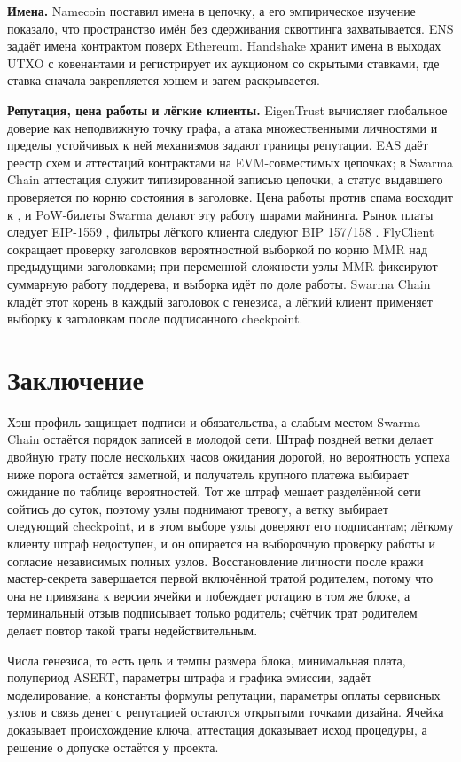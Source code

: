 \documentclass[10pt,a4paper]{article}
\begin{document}
\textbf{Имена.}
Namecoin \cite{namecoin} поставил имена в цепочку, а его эмпирическое изучение \cite{namecoinstudy} показало, что пространство имён без сдерживания сквоттинга захватывается.
ENS \cite{ens} задаёт имена контрактом поверх Ethereum.
Handshake \cite{handshake} хранит имена в выходах UTXO с ковенантами и регистрирует их аукционом со скрытыми ставками, где ставка сначала закрепляется хэшем и затем раскрывается.

\textbf{Репутация, цена работы и лёгкие клиенты.}
EigenTrust \cite{eigentrust} вычисляет глобальное доверие как неподвижную точку графа, а атака множественными личностями \cite{sybil} и пределы устойчивых к ней механизмов \cite{sybilproof} задают границы репутации.
EAS \cite{eas} даёт реестр схем и аттестаций контрактами на EVM-совместимых цепочках; в Swarma Chain аттестация служит типизированной записью цепочки, а статус выдавшего проверяется по корню состояния в заголовке.
Цена работы против спама восходит к \cite{dworknaor,hashcash}, и PoW-билеты Swarma делают эту работу шарами майнинга.
Рынок платы следует EIP-1559 \cite{eip1559}, фильтры лёгкого клиента следуют BIP 157/158 \cite{bip157,bip158}.
FlyClient \cite{flyclient} сокращает проверку заголовков вероятностной выборкой по корню MMR над предыдущими заголовками; при переменной сложности узлы MMR фиксируют суммарную работу поддерева, и выборка идёт по доле работы. Swarma Chain кладёт этот корень в каждый заголовок с генезиса, а лёгкий клиент применяет выборку к заголовкам после подписанного checkpoint.

\section{Заключение}

Хэш-профиль защищает подписи и обязательства, а слабым местом Swarma Chain остаётся порядок записей в молодой сети.
Штраф поздней ветки делает двойную трату после нескольких часов ожидания дорогой, но вероятность успеха ниже порога остаётся заметной, и получатель крупного платежа выбирает ожидание по таблице вероятностей.
Тот же штраф мешает разделённой сети сойтись до суток, поэтому узлы поднимают тревогу, а ветку выбирает следующий checkpoint, и в этом выборе узлы доверяют его подписантам; лёгкому клиенту штраф недоступен, и он опирается на выборочную проверку работы и согласие независимых полных узлов.
Восстановление личности после кражи мастер-секрета завершается первой включённой тратой родителем, потому что она не привязана к версии ячейки и побеждает ротацию в том же блоке, а терминальный отзыв подписывает только родитель; счётчик трат родителем делает повтор такой траты недействительным.

Числа генезиса, то есть цель и темпы размера блока, минимальная плата, полупериод ASERT, параметры штрафа и графика эмиссии, задаёт моделирование, а константы формулы репутации, параметры оплаты сервисных узлов и связь денег с репутацией остаются открытыми точками дизайна.
Ячейка доказывает происхождение ключа, аттестация доказывает исход процедуры, а решение о допуске остаётся у проекта.

{\footnotesize

\setlength{\itemsep}{0pt}

}
\end{document}
